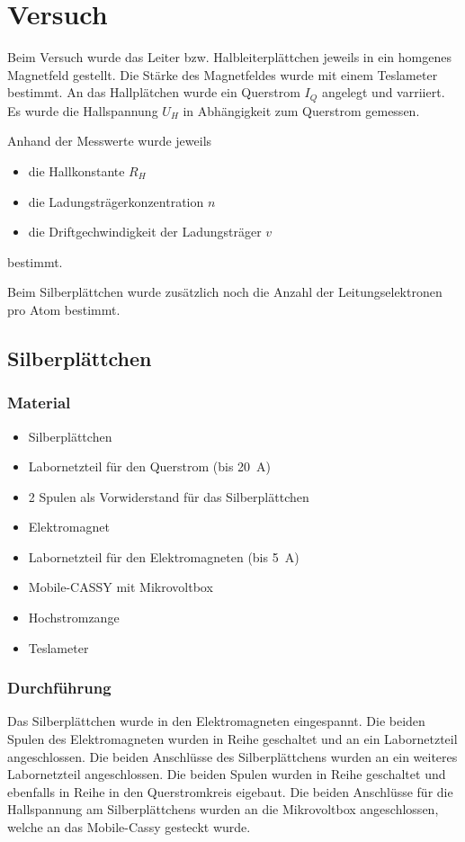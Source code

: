 \chapter{Versuch}
Beim Versuch wurde das Leiter bzw. Halbleiterplättchen jeweils in ein homgenes Magnetfeld gestellt. Die Stärke des Magnetfeldes wurde mit einem Teslameter bestimmt. An das Hallplätchen wurde ein Querstrom $I_Q$ angelegt und varriiert. Es wurde die Hallspannung $U_H$ in Abhängigkeit zum Querstrom gemessen.

Anhand der Messwerte wurde jeweils
\begin{itemize}
\item die Hallkonstante $R_H$
\item die Ladungsträgerkonzentration $n$
\item die Driftgechwindigkeit der Ladungsträger $v$
\end{itemize}
bestimmt.

Beim Silberplättchen wurde zusätzlich noch die Anzahl der Leitungselektronen pro Atom bestimmt.

\section{Silberplättchen}

\subsection{Material}
\begin{itemize}
\item Silberplättchen
\item Labornetzteil für den Querstrom (bis \SI{20}{\ampere})
\item 2 Spulen als Vorwiderstand für das Silberplättchen
\item Elektromagnet
\item Labornetzteil für den Elektromagneten (bis \SI{5}{\ampere})
\item Mobile-CASSY mit Mikrovoltbox
\item Hochstromzange
\item Teslameter
\end{itemize}

\subsection{Durchführung}
Das Silberplättchen wurde in den Elektromagneten eingespannt.
Die beiden Spulen des Elektromagneten wurden in Reihe geschaltet und an ein Labornetzteil angeschlossen.
Die beiden Anschlüsse des Silberplättchens wurden an ein weiteres Labornetzteil angeschlossen. Die beiden Spulen wurden in Reihe geschaltet und ebenfalls in Reihe in den Querstromkreis eigebaut.
Die beiden Anschlüsse für die Hallspannung am Silberplättchens wurden an die Mikrovoltbox angeschlossen, welche an das Mobile-Cassy gesteckt wurde.

